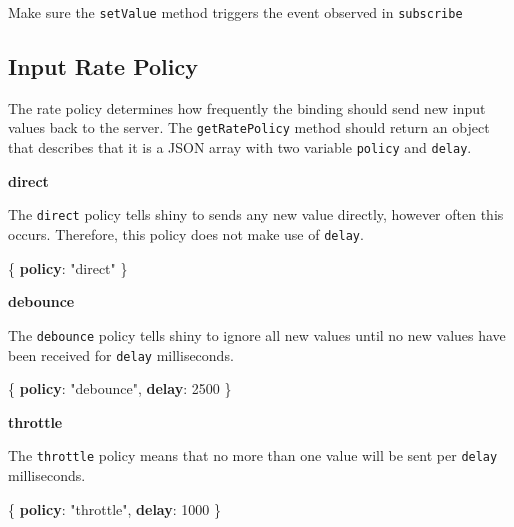 \documentclass[
  10pt,
]{krantz}
\makeatletter
\newenvironment{Shaded}{\begin{snugshade}}{\end{snugshade}}
\newcommand{\DecValTok}[1]{\textcolor[rgb]{0.06,0.06,0.06}{#1}}
\newcommand{\ErrorTok}[1]{\textcolor[rgb]{0.14,0.14,0.14}{\textbf{#1}}}
\newcommand{\FunctionTok}[1]{\textcolor[rgb]{0,0,0}{#1}}
\newcommand{\StringTok}[1]{\textcolor[rgb]{0.5,0.5,0.5}{#1}}
\newenvironment{kframe}{%
\medskip{}
\setlength{\fboxsep}{.8em}
 \def\at@end@of@kframe{}%
 \ifinner\ifhmode%
  \def\at@end@of@kframe{\end{minipage}}%
  \begin{minipage}{\columnwidth}%
 \fi\fi%
 \def\FrameCommand##1{\hskip\@totalleftmargin \hskip-\fboxsep
 \colorbox{shadecolor}{##1}\hskip-\fboxsep
     \hskip-\linewidth \hskip-\@totalleftmargin \hskip\columnwidth}%
 \MakeFramed {\advance\hsize-\width
   \@totalleftmargin\z@ \linewidth\hsize
   \@setminipage}}%
 {\par\unskip\endMakeFramed%
 \at@end@of@kframe}
\renewenvironment{Shaded}{\begin{kframe}}{\end{kframe}}
\newenvironment{rmdblock}[1]
  {
  \begin{itemize}
  \renewcommand{\labelitemi}{
    \raisebox{-.7\height}[0pt][0pt]{
      {\setkeys{Gin}{width=3em,keepaspectratio}\texttt{[image: images/\#1]}}
    }
  }
  \setlength{\fboxsep}{1em}
  \begin{kframe}
  \item
  }
  {
  \end{kframe}
  \end{itemize}
  }
\newenvironment{rmdnote}
  {\begin{rmdblock}{note}}
  {\end{rmdblock}}
\makeatother
\begin{document}
\begin{rmdnote}
Make sure the \texttt{setValue} method triggers the event observed in
\texttt{subscribe}
\end{rmdnote}

\hypertarget{shiny-input-rate-policy}{%
\subsection{Input Rate Policy}\label{shiny-input-rate-policy}}

The rate policy determines how frequently the binding should send new input values back to the server. The \texttt{getRatePolicy} method should return an object that describes that it is a JSON array with two variable \texttt{policy} and \texttt{delay}.

\textbf{direct}

The \texttt{direct} policy tells shiny to sends any new value directly, however often this occurs. Therefore, this policy does not make use of \texttt{delay}.

\begin{Shaded}
\begin{Highlighting}[]
\FunctionTok{\{}
  \ErrorTok{policy}\FunctionTok{:} \StringTok{"direct"}
\FunctionTok{\}}
\end{Highlighting}
\end{Shaded}

\textbf{debounce}

The \texttt{debounce} policy tells shiny to ignore all new values until no new values have been received for \texttt{delay} milliseconds.

\begin{Shaded}
\begin{Highlighting}[]
\FunctionTok{\{}
  \ErrorTok{policy}\FunctionTok{:} \StringTok{"debounce"}\FunctionTok{,}
  \ErrorTok{delay}\FunctionTok{:} \DecValTok{2500}
\FunctionTok{\}}
\end{Highlighting}
\end{Shaded}

\textbf{throttle}

The \texttt{throttle} policy means that no more than one value will be sent per \texttt{delay} milliseconds.

\begin{Shaded}
\begin{Highlighting}[]
\FunctionTok{\{}
  \ErrorTok{policy}\FunctionTok{:} \StringTok{"throttle"}\FunctionTok{,}
  \ErrorTok{delay}\FunctionTok{:} \DecValTok{1000}
\FunctionTok{\}}
\end{Highlighting}
\end{Shaded}
\end{document}
